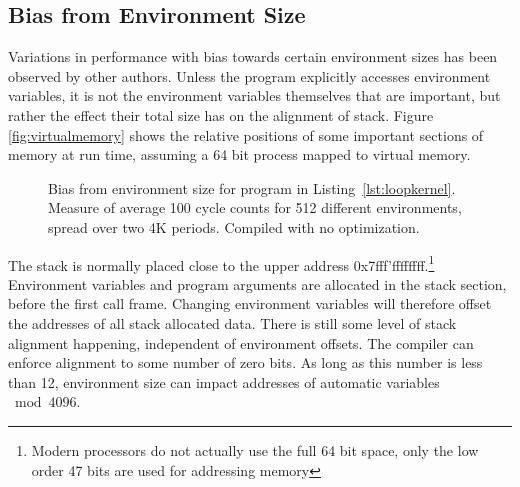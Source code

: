 \documentclass[a4paper,10pt,twocolumn,twoside]{article}
\begin{document}
\subsection{Bias from Environment Size}
Variations in performance with bias towards certain environment sizes has been observed by other authors.
Unless the program explicitly accesses environment variables, it is not the environment variables themselves that are important, but rather the effect their total size has on the alignment of stack. 
Figure \ref{fig:virtualmemory} shows the relative positions of some important sections of memory at run time, assuming a 64 bit process mapped to virtual memory. 

\begin{figure*}[t]
  \caption{Bias from environment size for program in Listing~\ref{lst:loopkernel}. Measure of average 100 cycle counts for 512 different environments, spread over two 4K periods. Compiled with no optimization.}
  \label{fig:envbias}
\end{figure*}

The stack is normally placed close to the upper address 0x7fff'ffffffff.\footnote{Modern processors do not actually use the full 64 bit space, only the low order 47 bits are used for addressing memory}
Environment variables and program arguments are allocated in the stack section, before the first call frame.
Changing environment variables will therefore offset the addresses of all stack allocated data.
There is still some level of stack alignment happening, independent of environment offsets. 
The compiler can enforce alignment to some number of zero bits.
As long as this number is less than 12, environment size can impact addresses of automatic variables $\bmod 4096$.
\end{document}
